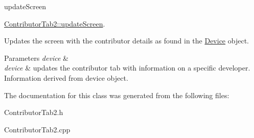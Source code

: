 update\+Screen 

\hyperlink{classContributorTab2_abf252c3c3cacdc4a4d1f369ffd4fbb99}{Contributor\+Tab2\+::update\+Screen}.

Updates the screen with the contributor details as found in the \hyperlink{classDevice}{Device} object. 
\begin{DoxyParams}{Parameters}
{\em device} & \\
\hline
{\em device} & updates the contributor tab with information on a specific developer. Information derived from device object. \\
\hline
\end{DoxyParams}


The documentation for this class was generated from the following files\+:\begin{DoxyCompactItemize}
\item 
Contributor\+Tab2.\+h\item 
Contributor\+Tab2.\+cpp\end{DoxyCompactItemize}
